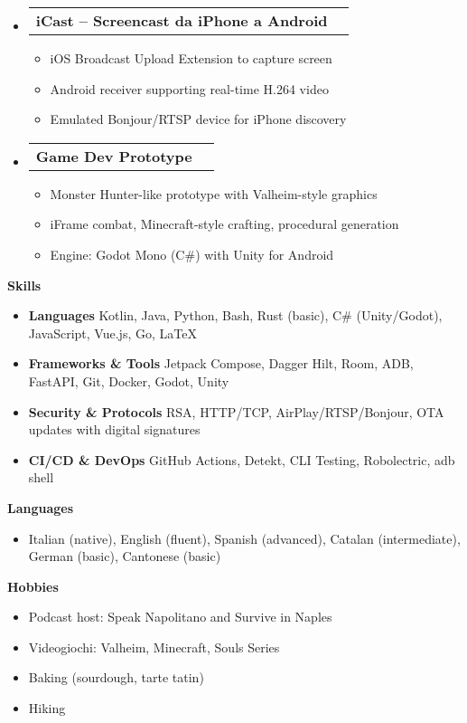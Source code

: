 \documentclass[letterpaper,12pt]{article}[leftmargin=*]
\makeatletter
\def \entryspacing {-0pt}
\renewcommand{\section}[2]{\vspace{5pt}
  \colorbox{secondary}{\color{white}\raggedbottom\normalsize\textbf{{#1}{\hspace{7pt}#2}}}
}
\newcommand{\resumeEntryStart}{\begin{itemize}[leftmargin=2.5mm]}
\newcommand{\resumeEntryEnd}{\end{itemize}\vspace{\entryspacing}}
\newcommand{\resumeItemListStart}{\begin{itemize}[leftmargin=*,itemsep=0pt]}
\newcommand{\resumeItemListEnd}{\end{itemize}}
\newcommand{\resumeItem}[1]{
  \item\small{
    {#1 \vspace{-2pt}}
  }
}
\newcommand{\resumeEntryTD}[2]{
  \vspace{-1pt}\item[]
    \begin{tabularx}{0.97\textwidth}{X@{\hspace{60pt}}r}
      \textbf{\color{primary}#1} & {\firabook\color{accent}\small#2} \\
    \end{tabularx}\vspace{-6pt}
}
\newcommand{\resumeEntryS}[2]{
  \item[]\small{
    \textbf{\color{primary}#1 }{ #2 \vspace{-6pt}}
  }
}
\makeatother
\begin{document}
  \resumeEntryStart
    \resumeEntryTD
      {iCast -- Screencast da iPhone a Android}{}
    \resumeItemListStart
        \resumeItem{iOS Broadcast Upload Extension to capture screen}
        \resumeItem{Android receiver supporting real-time H.264 video}
        \resumeItem{Emulated Bonjour/RTSP device for iPhone discovery}
    \resumeItemListEnd
  \resumeEntryEnd

  \resumeEntryStart
    \resumeEntryTD
      {Game Dev Prototype}{}
    \resumeItemListStart
        \resumeItem{Monster Hunter-like prototype with Valheim-style graphics}
        \resumeItem{iFrame combat, Minecraft-style crafting, procedural generation}
        \resumeItem{Engine: Godot Mono (C\#) with Unity for Android}
    \resumeItemListEnd
  \resumeEntryEnd

\section{}{Skills}
 \resumeEntryStart
   \resumeEntryS{Languages}{Kotlin, Java, Python, Bash, Rust (basic), C\# (Unity/Godot), JavaScript, Vue.js, Go, LaTeX}
   \resumeEntryS{Frameworks \& Tools}{Jetpack Compose, Dagger Hilt, Room, ADB, FastAPI, Git, Docker, Godot, Unity}
   \resumeEntryS{Security \& Protocols}{RSA, HTTP/TCP, AirPlay/RTSP/Bonjour, OTA updates with digital signatures}
   \resumeEntryS{CI/CD \& DevOps}{GitHub Actions, Detekt, CLI Testing, Robolectric, adb shell}
 \resumeEntryEnd

\section{}{Languages}
  \resumeEntryStart
    \resumeEntryS{}{Italian (native), English (fluent), Spanish (advanced), Catalan (intermediate), German (basic), Cantonese (basic)}
  \resumeEntryEnd

\section{}{Hobbies}
  \resumeEntryStart
    \resumeEntryS{}{Podcast host: Speak Napolitano and Survive in Naples}
    \resumeEntryS{}{Videogiochi: Valheim, Minecraft, Souls Series}
    \resumeEntryS{}{Baking (sourdough, tarte tatin)}
    \resumeEntryS{}{Hiking}
  \resumeEntryEnd
\end{document}
